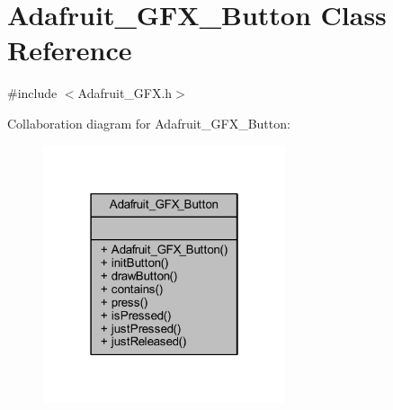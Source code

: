 \hypertarget{class_adafruit___g_f_x___button}{}\section{Adafruit\+\_\+\+G\+F\+X\+\_\+\+Button Class Reference}
\label{class_adafruit___g_f_x___button}


{\ttfamily \#include $<$Adafruit\+\_\+\+G\+F\+X.\+h$>$}



Collaboration diagram for Adafruit\+\_\+\+G\+F\+X\+\_\+\+Button\+:\nopagebreak
\begin{figure}[H]
\begin{center}
\leavevmode
\includegraphics[width=202pt]{class_adafruit___g_f_x___button__coll__graph}
\end{center}
\end{figure}
